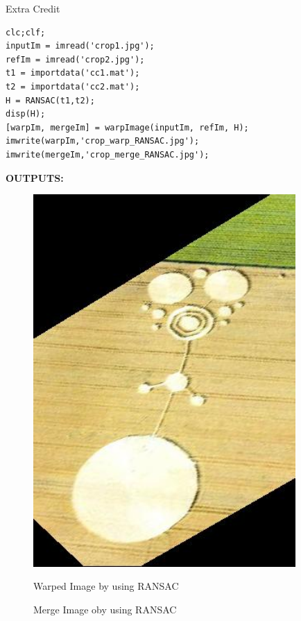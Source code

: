 \documentclass[a4paper,12pt]{article}
\begin{document}
\clearpage
\begin{section}{Extra Credit}
\begin{lstlisting}[frame=single]  % Start your code-block
%% Optional (a) RANSAC
clc;clf;
inputIm = imread('crop1.jpg');
refIm = imread('crop2.jpg');
t1 = importdata('cc1.mat');
t2 = importdata('cc2.mat');
H = RANSAC(t1,t2);
disp(H);
[warpIm, mergeIm] = warpImage(inputIm, refIm, H);
imwrite(warpIm,'crop_warp_RANSAC.jpg');
imwrite(mergeIm,'crop_merge_RANSAC.jpg');

\end{lstlisting}

\textbf{OUTPUTS:}
\\

 \begin{figure}[!htb]
       \center
       {\includegraphics[width=10cm]
       {crop_warp_RANSAC.png}}
        \caption{Warped Image by using RANSAC}
      \end{figure}



\begin{figure}[!htb]
        \caption{Merge Image oby using RANSAC}
      \end{figure}


\end{section}
\end{document}
